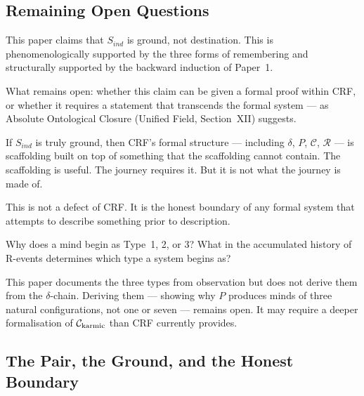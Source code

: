 \documentclass[12pt, a4paper]{article}
\begin{document}
\subsection{Remaining Open Questions}

\begin{openqbox}[title={Open: The Ontological Status of $S_{ind}$ as Ground}]
This paper claims that $S_{ind}$ is ground, not destination.
This is phenomenologically supported by the three forms of remembering
and structurally supported by the backward induction of Paper~1.

What remains open: whether this claim can be given a formal proof within CRF,
or whether it requires a statement that transcends the formal system ---
as Absolute Ontological Closure (Unified Field, Section~XII) suggests.

If $S_{ind}$ is truly ground, then CRF's formal structure --- including
$\delta$, $P$, $\mathcal{C}$, $\mathcal{R}$ --- is scaffolding built on top
of something that the scaffolding cannot contain. The scaffolding is useful.
The journey requires it. But it is not what the journey is made of.

This is not a defect of CRF. It is the honest boundary of any formal system
that attempts to describe something prior to description.
\end{openqbox}

\begin{openqbox}[title={Open: The Mechanism of Type Determination}]
Why does a mind begin as Type~1, 2, or 3? What in the accumulated history
of R-events determines which type a system begins as?

This paper documents the three types from observation but does not derive
them from the $\delta$-chain. Deriving them --- showing why $P$ produces
minds of three natural configurations, not one or seven --- remains open.
It may require a deeper formalisation of $\mathcal{C}_{\rm karmic}$ than
CRF currently provides.
\end{openqbox}

\subsection*{The Pair, the Ground, and the Honest Boundary}
\label{sec:ground:axis}

\end{document}
